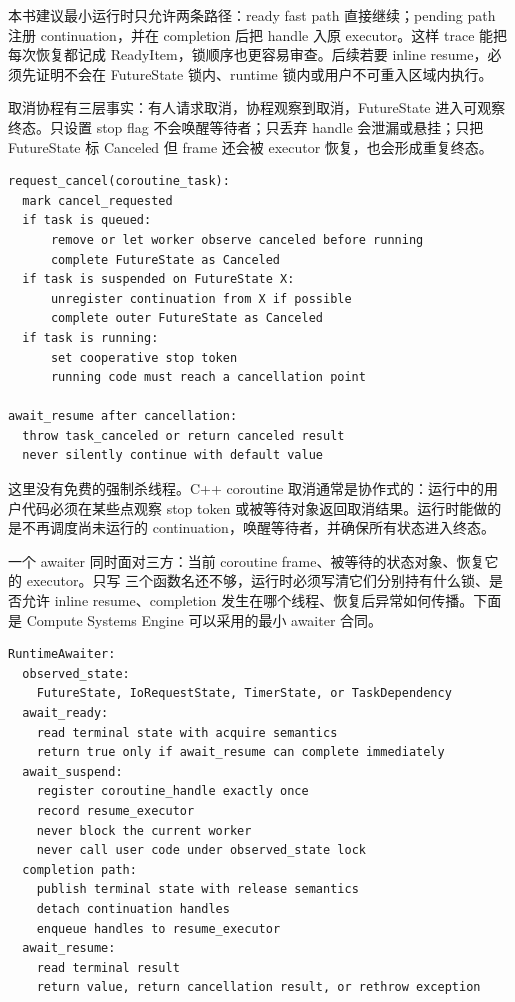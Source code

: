本书建议最小运行时只允许两条路径：ready fast path 直接继续；pending path 注册 continuation，并在 completion 后把 handle 入原 executor。这样 trace 能把每次恢复都记成 ReadyItem，锁顺序也更容易审查。后续若要 inline resume，必须先证明不会在 FutureState 锁内、runtime 锁内或用户不可重入区域内执行。

取消协程有三层事实：有人请求取消，协程观察到取消，FutureState 进入可观察终态。只设置 stop flag 不会唤醒等待者；只丢弃 handle 会泄漏或悬挂；只把 FutureState 标 Canceled 但 frame 还会被 executor 恢复，也会形成重复终态。

\begin{lstlisting}[numbers=none,caption={coroutine cancellation 的审查账本}]
request_cancel(coroutine_task):
  mark cancel_requested
  if task is queued:
      remove or let worker observe canceled before running
      complete FutureState as Canceled
  if task is suspended on FutureState X:
      unregister continuation from X if possible
      complete outer FutureState as Canceled
  if task is running:
      set cooperative stop token
      running code must reach a cancellation point

await_resume after cancellation:
  throw task_canceled or return canceled result
  never silently continue with default value
\end{lstlisting}

这里没有免费的强制杀线程。C++ coroutine 取消通常是协作式的：运行中的用户代码必须在某些点观察 stop token 或被等待对象返回取消结果。运行时能做的是不再调度尚未运行的 continuation，唤醒等待者，并确保所有状态进入终态。

一个 awaiter 同时面对三方：当前 coroutine frame、被等待的状态对象、恢复它的 executor。只写  三个函数名还不够，运行时必须写清它们分别持有什么锁、是否允许 inline resume、completion 发生在哪个线程、恢复后异常如何传播。下面是 Compute Systems Engine 可以采用的最小 awaiter 合同。

\begin{lstlisting}[numbers=none,caption={运行时 awaiter 的最低合同}]
RuntimeAwaiter:
  observed_state:
    FutureState, IoRequestState, TimerState, or TaskDependency
  await_ready:
    read terminal state with acquire semantics
    return true only if await_resume can complete immediately
  await_suspend:
    register coroutine_handle exactly once
    record resume_executor
    never block the current worker
    never call user code under observed_state lock
  completion path:
    publish terminal state with release semantics
    detach continuation handles
    enqueue handles to resume_executor
  await_resume:
    read terminal result
    return value, return cancellation result, or rethrow exception
\end{lstlisting}

